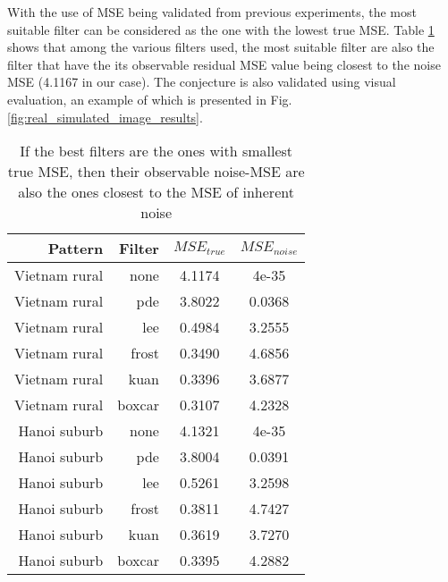 \documentclass[journal]{IEEEtran}
\begin{document}
With the use of MSE being validated from previous experiments, 
	the most suitable filter can be considered as the one with the lowest true MSE.
Table \ref{tab:mse_true_noise_log_domain} shows that among the various filters used, 
	the most suitable filter are also the filter that 
		have the its observable residual MSE value being closest to the noise MSE (4.1167 in our case).
The conjecture is also validated using visual evaluation, an example of
	which is presented in Fig. \ref{fig:real_simulated_image_results}.

\begin{table}
\centering
\begin{tabular}{r|r|c|c}
Pattern  & Filter  & $MSE_{true}$   & $MSE_{noise}$      \\%
\hline
Vietnam rural	& none		& 4.1174	& 4e-35\\
Vietnam rural	& pde			& 3.8022	& 0.0368\\
Vietnam rural	& lee			& 0.4984	& 3.2555\\
Vietnam rural	& frost		& 0.3490	& 4.6856\\
Vietnam rural	& kuan		& 0.3396	& 3.6877\\
Vietnam rural	& boxcar	& 0.3107	& 4.2328\\
\hline
Hanoi suburb	& none		& 4.1321	& 4e-35\\
Hanoi suburb	& pde			& 3.8004	& 0.0391\\
Hanoi suburb	& lee			& 0.5261	& 3.2598\\
Hanoi suburb	& frost		& 0.3811	& 4.7427\\
Hanoi suburb	& kuan		& 0.3619	& 3.7270\\
Hanoi suburb	& boxcar	& 0.3395	& 4.2882\\
\hline
\end{tabular}

\caption{If the best filters are the ones with smallest true MSE, then their observable noise-MSE are also the ones closest to the MSE of inherent noise}
\label{tab:mse_true_noise_log_domain}
\end{table}
\end{document}

